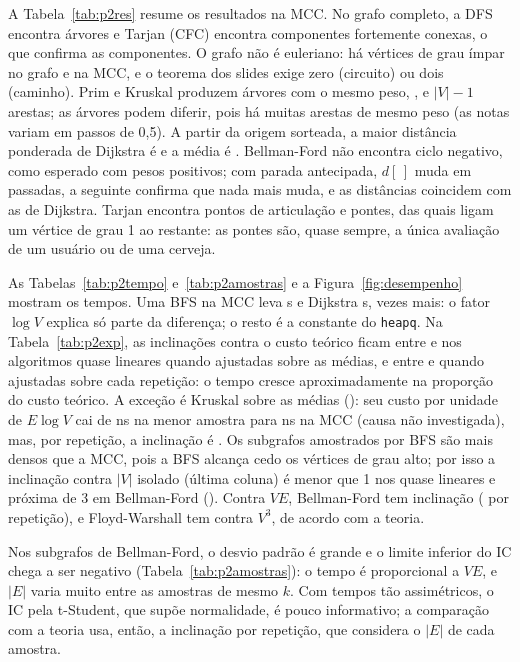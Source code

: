 \documentclass[sigconf]{webmedia}
\begin{document}
A Tabela~\ref{tab:p2res} resume os resultados na MCC. No grafo completo, a DFS encontra
\DFSArvores{} árvores e Tarjan (CFC) encontra \TarjanCFC{} componentes fortemente conexas, o que
confirma as \NComponentes{} componentes. O grafo não é euleriano: há \EulerImpares{} vértices de
grau ímpar no grafo e \EulerImparesMCC{} na MCC, e o teorema dos slides exige zero (circuito) ou
dois (caminho). Prim e Kruskal produzem árvores com o mesmo peso, \AGMPeso{}, e $|V|-1$ arestas;
as árvores podem diferir, pois há muitas arestas de mesmo peso (as notas variam em passos de 0,5).
A partir da origem sorteada, a maior distância ponderada de Dijkstra é \DijkstraMax{} e a média é
\DijkstraMedia{}. Bellman-Ford não encontra ciclo negativo, como esperado com pesos positivos;
com parada antecipada, $d[\,]$ muda em \BFPassadasUteis{} passadas, a seguinte confirma que nada
mais muda, e as distâncias coincidem com as de Dijkstra. Tarjan encontra \TarjanArt{} pontos de
articulação e \TarjanPontes{} pontes, das quais \TarjanPontesFolha{} ligam um vértice de grau 1
ao restante: as pontes são, quase sempre, a única avaliação de um usuário ou de uma cerveja.



As Tabelas~\ref{tab:p2tempo} e~\ref{tab:p2amostras} e a Figura~\ref{fig:desempenho} mostram os
tempos. Uma BFS na MCC leva \TempoBFS{} s e Dijkstra \TempoDijkstra{} s, \RazaoDijkstraBFS{}
vezes mais: o fator $\log V$ explica só parte da diferença; o resto é a constante do
\texttt{heapq}. Na Tabela~\ref{tab:p2exp}, as inclinações contra o custo teórico ficam entre
\ExpMin{} e \ExpMax{} nos algoritmos quase lineares quando ajustadas sobre as médias, e entre
\ExpRepMin{} e \ExpRepMax{} quando ajustadas sobre cada repetição: o tempo cresce
aproximadamente na proporção do custo teórico. A exceção é Kruskal sobre as médias
(\ExpKruskal{}): seu custo por unidade de $E\log V$ cai de \KruskalNsMaior{} ns na menor amostra
para \KruskalNsMCC{} ns na MCC (causa não investigada), mas, por repetição, a inclinação é
\ExpKruskalRep{}. Os subgrafos amostrados por BFS são mais densos que a MCC, pois a BFS alcança
cedo os vértices de grau alto; por isso a inclinação contra $|V|$ isolado (última coluna) é menor
que 1 nos quase lineares e próxima de 3 em Bellman-Ford (\ExpBFV{}). Contra $VE$, Bellman-Ford tem
inclinação \ExpBF{} (\ExpBFRep{} por repetição), e Floyd-Warshall tem \ExpFW{} contra $V^3$, de
acordo com a teoria.

Nos subgrafos de Bellman-Ford, o desvio padrão é grande e o limite inferior do IC chega a ser
negativo (Tabela~\ref{tab:p2amostras}): o tempo é proporcional a $VE$, e $|E|$ varia muito entre
as amostras de mesmo $k$. Com tempos tão assimétricos, o IC pela t-Student, que supõe
normalidade, é pouco informativo; a comparação com a teoria usa, então, a inclinação por
repetição, que considera o $|E|$ de cada amostra.
\end{document}

